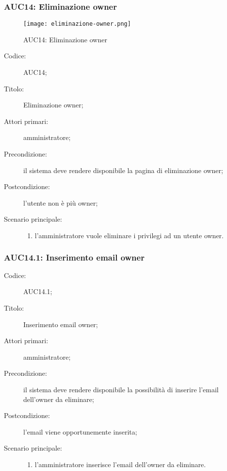 \documentclass[../../../analisi-dei-requisiti.tex]{subfiles}
\begin{document}
\subsubsection{AUC14: Eliminazione owner}%
\label{subs:AUC14}

\begin{figure}[H]
  \centering
  \texttt{[image: eliminazione-owner.png]}
  \caption{AUC14: Eliminazione owner}%
  \label{fig:AUC14}
\end{figure}

\begin{description}
  \item[Codice:] AUC14;
  \item[Titolo:] Eliminazione owner;
  \item[Attori primari:] amministratore;
  \item[Precondizione:] il sistema deve rendere disponibile la pagina di eliminazione owner;
  \item[Postcondizione:] l'utente non è più owner;
  \item[Scenario principale:]
  \begin{enumerate}
    \item l'amministratore vuole eliminare i privilegi ad un utente owner.
  \end{enumerate}
\end{description}

\subsubsection{AUC14.1: Inserimento email owner}%
\label{subs:AUC14.1}
\begin{description}
  \item[Codice:] AUC14.1;
  \item[Titolo:] Inserimento email owner;
  \item[Attori primari:] amministratore;
  \item[Precondizione:] il sistema deve rendere disponibile la possibilità di inserire l'email dell'owner da eliminare;
  \item[Postcondizione:] l'email viene opportunemente inserita;
  \item[Scenario principale:]
  \begin{enumerate}
    \item l'amministratore inserisce l'email dell'owner da eliminare.
  \end{enumerate}
\end{description}
\end{document}
